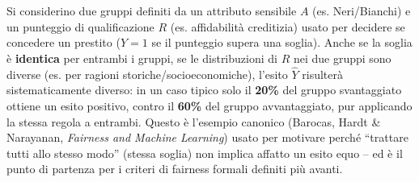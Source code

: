 \documentclass[a4paper,11pt]{article}
\begin{document}
\begin{esempio}
Si considerino due gruppi definiti da un attributo sensibile $A$ (es. Neri/Bianchi) e un punteggio di qualificazione $R$ (es. affidabilit\`{a} creditizia) usato per decidere se concedere un prestito ($\hat{Y}=1$ se il punteggio supera una soglia). Anche se la soglia \`{e} \textbf{identica} per entrambi i gruppi, se le distribuzioni di $R$ nei due gruppi sono diverse (es. per ragioni storiche/socioeconomiche), l'esito $\hat{Y}$ risulter\`{a} sistematicamente diverso: in un caso tipico solo il \textbf{20\%} del gruppo svantaggiato ottiene un esito positivo, contro il \textbf{60\%} del gruppo avvantaggiato, pur applicando la stessa regola a entrambi. Questo \`{e} l'esempio canonico (Barocas, Hardt \& Narayanan, \emph{Fairness and Machine Learning}) usato per motivare perch\'{e} ``trattare tutti allo stesso modo'' (stessa soglia) non implica affatto un esito equo -- ed \`{e} il punto di partenza per i criteri di fairness formali definiti pi\`{u} avanti.
\end{esempio}
\end{document}
